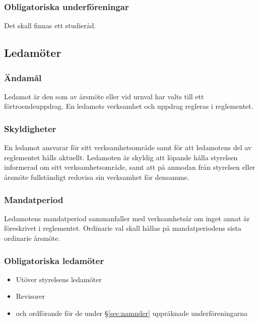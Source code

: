 \documentclass{../resources/dgovdoc}
\begin{document}
\subsubsection{Obligatoriska underföreningar}

Det skall finnas ett studieråd.

\subsection{Ledamöter}

\subsubsection{Ändamål}

Ledamot är den som av årsmöte eller vid urnval har valts till ett
förtroendeuppdrag. En ledamots verksamhet och uppdrag regleras i
reglementet.

\subsubsection{Skyldigheter}

En ledamot ansvarar för sitt verksamhetsområde samt för att ledamotens del
av reglementet hålls aktuellt. Ledamoten är skyldig att löpande hålla
styrelsen informerad om sitt verksamhetsområde, samt att på anmodan från
styrelsen eller årsmöte fullständigt redovisa sin verksamhet för densamme.

\subsubsection{Mandatperiod}

Ledamotens mandatperiod sammanfaller med verksamhetsår om inget annat är
föreskrivet i reglementet. Ordinarie val skall hållas på mandatperiodens sista
ordinarie årsmöte.

\subsubsection{Obligatoriska ledamöter}

\begin{itemize}

  \item Utöver styrelsens ledamöter 
  \item Revisorer 
  \item och ordförande för de under \S\ref{sec:namnder} uppräknade underföreningarna

\end{itemize}
\end{document}
